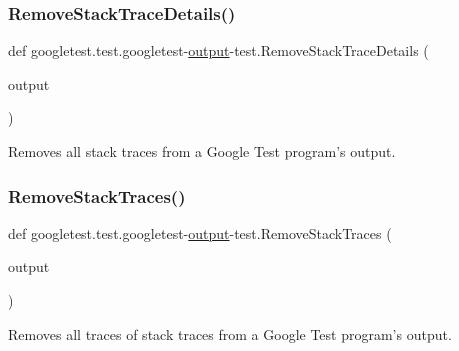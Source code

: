 \subsubsection{\texorpdfstring{RemoveStackTraceDetails()}{RemoveStackTraceDetails()}}
{\footnotesize\ttfamily def googletest.\+test.\+googletest-\/\mbox{\hyperlink{namespacegoogletest_1_1test_1_1googletest-output-test_a6773c2217ae4694b4db5610620562437}{output}}-\/test.\+Remove\+Stack\+Trace\+Details (\begin{DoxyParamCaption}\item[{}]{output }\end{DoxyParamCaption})}

\begin{DoxyVerb}Removes all stack traces from a Google Test program's output.\end{DoxyVerb}
 \mbox{\label{namespacegoogletest_1_1test_1_1googletest-output-test_a9a0decf62a91fdd58802a2da17829bb1}} 
\subsubsection{\texorpdfstring{RemoveStackTraces()}{RemoveStackTraces()}}
{\footnotesize\ttfamily def googletest.\+test.\+googletest-\/\mbox{\hyperlink{namespacegoogletest_1_1test_1_1googletest-output-test_a6773c2217ae4694b4db5610620562437}{output}}-\/test.\+Remove\+Stack\+Traces (\begin{DoxyParamCaption}\item[{}]{output }\end{DoxyParamCaption})}

\begin{DoxyVerb}Removes all traces of stack traces from a Google Test program's output.\end{DoxyVerb}
 \mbox{\label{namespacegoogletest_1_1test_1_1googletest-output-test_a80bd550648220abb73a9fe43cadab20b}} 
